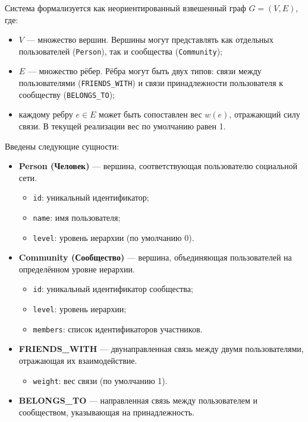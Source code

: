 Система формализуется как неориентированный взвешенный граф $G = (V, E)$, где:

\begin{itemize}
    \item $V$ — множество вершин. Вершины могут представлять как отдельных пользователей (\texttt{Person}), так и сообщества (\texttt{Community});
    \item $E$ — множество рёбер. Рёбра могут быть двух типов: связи между пользователями (\texttt{FRIENDS\_WITH}) и связи принадлежности пользователя к сообществу (\texttt{BELONGS\_TO});
    \item каждому ребру $e \in E$ может быть сопоставлен вес $w(e)$, отражающий силу связи. В текущей реализации вес по умолчанию равен 1.
\end{itemize}

Введены следующие сущности:

\begin{itemize}
    \item \textbf{Person (Человек)} — вершина, соответствующая пользователю социальной сети.
    \begin{itemize}
        \item \texttt{id}: уникальный идентификатор;
        \item \texttt{name}: имя пользователя;
        \item \texttt{level}: уровень иерархии (по умолчанию 0).
    \end{itemize}
    
    \item \textbf{Community (Сообщество)} — вершина, объединяющая пользователей на определённом уровне иерархии.
    \begin{itemize}
        \item \texttt{id}: уникальный идентификатор сообщества;
        \item \texttt{level}: уровень иерархии;
        \item \texttt{members}: список идентификаторов участников.
    \end{itemize}
    
    \item \textbf{FRIENDS\_WITH} — двунаправленная связь между двумя пользователями, отражающая их взаимодействие.
    \begin{itemize}
        \item \texttt{weight}: вес связи (по умолчанию 1).
    \end{itemize}
    
    \item \textbf{BELONGS\_TO} — направленная связь между пользователем и сообществом, указывающая на принадлежность.
\end{itemize}

